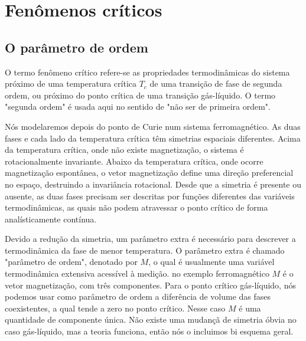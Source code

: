 \chapter{Fenômenos críticos}
\noindent

\section{O parâmetro de ordem}
\noindent

O termo fenômeno crítico refere-se as propriedades termodinâmicas do sistema próximo de uma temperatura crítica $T_{c}$ de uma transição de fase de segunda ordem, ou próximo do ponto crítica de uma transição gás-líquido. O termo "segunda ordem" é usada aqui no sentido de "não ser de primeira ordem".

Nós modelaremos depois do ponto de Curie num sistema ferromagnético. As duas fases e cada lado da temperatura crítica têm simetrias espaciais diferentes. Acima da temperatura crítica, onde não existe magnetização, o sistema é rotacionalmente invariante. Abaixo da temperatura crítica, onde ocorre magnetização espontânea, o vetor magnetização define uma direção preferencial no espaço, destruindo a invariância rotacional. Desde que a simetria é presente ou ausente, as duas fases precisam ser descritas por funções diferentes das variáveis termodinâmicas, as quais não podem atravessar o ponto crítico de forma analísticamente contínua.

Devido a redução da simetria, um parâmetro extra é necessário para descrever a termodinâmica da fase de menor temperatura. O parâmetro extra é chamado "parâmetro de ordem", denotado por $M$, o qual é usualmente uma variável termodinâmica extensiva acessível à medição. no exemplo ferromagnético $M$ é o vetor magnetização, com três componentes. Para o ponto crítico gás-líquido, nós podemos usar como parâmetro de ordem a diferência de volume das fases coexistentes, a qual tende a zero no ponto crítico. Nesse caso $M$ é uma quantidade de componente única. Não existe uma mudançã de simetria óbvia no caso gás-líquido, mas a teoria funciona, então nós o incluimos bi esquema geral.

